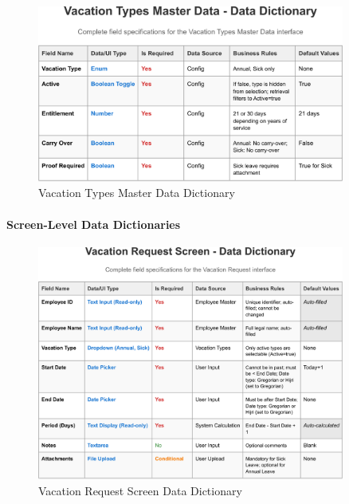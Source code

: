 \documentclass[12pt,a4paper]{article}
\begin{document}
\begin{figure}[H]
\centering
\includegraphics[width=0.9\textwidth]{Data-Dictionary/Master-Data-Dictionaries/Vacation-Types-Master-Data-Data-Dictionary/Vacation-Types-Master-Data-Data-Dictionary-1.png}
\caption{Vacation Types Master Data Dictionary}
\label{fig:vacation-types-master-data}
\end{figure}

\paragraph{Screen-Level Data Dictionaries}
\begin{figure}[H]
\centering
\includegraphics[width=0.9\textwidth]{Data-Dictionary/Screen-Data-Dictionaries/Vacation-Request-Screen-Data-Dictionary/Vacation-Request-Screen-Data-Dictionary-1.png}
\caption{Vacation Request Screen Data Dictionary}
\label{fig:vacation-request-data-dict}
\end{figure}
\end{document}
